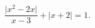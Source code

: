 \begin{ex}[type=equation]
	\begin{condition}
		$\dfrac{\big|x^2 -2x\big|}{x - 3}+ \big|x+ 2\big|= 1.$
	\end{condition}
\end{ex}
